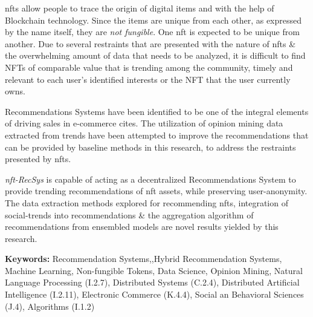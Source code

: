 
\gls{nft}s allow people to trace the origin of digital items and with the help of Blockchain technology. Since the items are unique from each other, as expressed by the name itself, they are \textit{not fungible}. One \gls{nft} is expected to be unique from another. 
Due to several restraints that are presented with the nature of \gls{nft}s \& the overwhelming amount of data that needs to be analyzed, it is difficult to find NFTs of comparable value that is trending among the community, timely and relevant to each user’s identified interests or the NFT that the user currently owns.

Recommendations Systems have been identified to be one of the integral elements of driving sales in e-commerce cites. The utilization of opinion mining data extracted from trends have been attempted to improve the recommendations that can be provided by baseline methods in this research, to address the restraints presented by \gls{nft}s.

\textit{\gls{nft}-RecSys} is capable of acting as a decentralized Recommendations System to provide trending recommendations of \gls{nft} assets, while preserving user-anonymity. The data extraction methods explored for recommending \gls{nft}s, integration of social-trends into recommendations \& the aggregation algorithm of recommendations from ensembled models are novel results yielded by this research.

\bigbreak
\textbf{Keywords:} Recommendation Systems,,Hybrid Recommendation Systems, Machine Learning, Non-fungible Tokens, Data Science, Opinion Mining, Natural Language Processing (I.2.7),  Distributed Systems (C.2.4), Distributed Artificial Intelligence (I.2.11), Electronic Commerce (K.4.4), Social an Behavioral Sciences (J.4), Algorithms (I.1.2)
